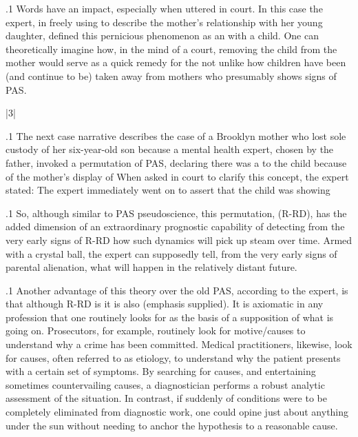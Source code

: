 \documentclass[11pt, twoside]{article}
\begin{document}
{\p.1{%
Words have an impact, especially when uttered in court. In this case
the expert, in freely using  to describe the mother’s relationship with her young daughter, defined this pernicious phenomenon
as an  with a child. One can theoretically
imagine how, in the mind of a court, removing the child from the mother
would serve as a quick remedy for the \mdash{}not unlike how
children have been (and continue to be) taken away from mothers who
presumably shows signs of PAS.
}%


\s|3|{
}

\p.1{%
\noindent{}The next case narrative describes the case of a Brooklyn mother who
lost sole custody of her six-year-old son because a mental health expert, chosen by the father, invoked a permutation of PAS, declaring
there was a  to the child because of the mother’s display of  When
asked in court to clarify this concept, the expert stated:  The expert immediately went on to assert that the
child was showing 
}%

\p.1{%
So, although similar to PAS pseudoscience, this permutation,
 (R-RD),
has the added dimension of an extraordinary prognostic capability of
detecting from the very early signs of R-RD how such dynamics will pick
up steam over time. Armed with a crystal ball, the expert can supposedly
tell, from the very early signs of parental alienation, what will happen
in the relatively distant future.
}%

\p.1{%
Another advantage of this theory over the old PAS, according
to the expert, is that although R-RD
is  it is also  (emphasis supplied). It is axiomatic in any profession that one routinely looks
for  as the basis of a supposition of what is going on. Prosecutors, for example, routinely look for motive/causes to understand
why a crime has been committed. Medical practitioners, likewise,
look for causes, often referred to as etiology, to understand why the
patient presents with a certain set of symptoms. By searching for
causes, and entertaining sometimes countervailing causes, a diagnostician performs a robust analytic assessment of the situation. In contrast,
if suddenly  of conditions were to be completely eliminated
from diagnostic work, one could opine just about anything under
the sun without needing to anchor the hypothesis to a reasonable
cause.
}%

}
\end{document}
